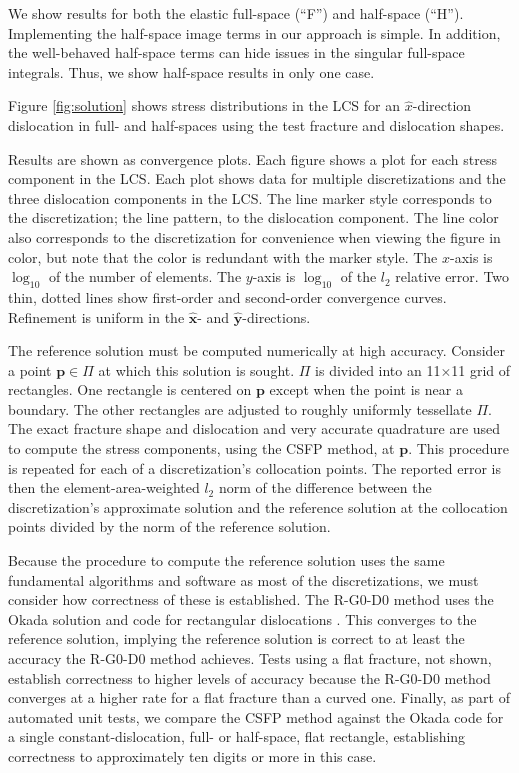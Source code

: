 \documentclass[11pt]{article}
\renewcommand{\vec}[1]{\boldsymbol{#1}}
\newcommand{\uvec}[1]{\hat{\boldsymbol{#1}}}
\begin{document}
We show results for both the elastic full-space (``F'') and half-space (``H'').
Implementing the half-space image terms in our approach is simple.
In addition, the well-behaved half-space terms can hide issues in the singular full-space integrals.
Thus, we show half-space results in only one case.

Figure \ref{fig:solution} shows stress distributions
in the LCS for an $\hat{x}$-direction dislocation in full- and half-spaces
using the test fracture and dislocation shapes.

Results are shown as convergence plots.
Each figure shows a plot for each stress component in the LCS.
Each plot shows data for multiple discretizations
and the three dislocation components in the LCS.
The line marker style corresponds to the discretization;
the line pattern, to the dislocation component.
The line color also corresponds to the discretization
for convenience when viewing the figure in color,
but note that the color is redundant with the marker style.
The $x$-axis is $\log_{10}$ of the number of elements.
The $y$-axis is $\log_{10}$ of the $l_2$ relative error.
Two thin, dotted lines show first-order and second-order convergence curves.
Refinement is uniform in the $\uvec{x}$- and $\uvec{y}$-directions.

The reference solution must be computed numerically at high accuracy.
Consider a point $\vec{p} \in \Pi$ at which this solution is sought.
$\Pi$ is divided into an 11$\times$11 grid of rectangles.
One rectangle is centered on $\vec{p}$
except when the point is near a boundary.
The other rectangles are adjusted to roughly uniformly tessellate $\Pi$.
The exact fracture shape and dislocation and very accurate quadrature
are used to compute the stress components,
using the CSFP method, at $\vec{p}$.
This procedure is repeated for each of a discretization's collocation points.
The reported error is then the element-area-weighted $l_2$ norm of
the difference between the discretization's approximate solution
and the reference solution at the collocation points
divided by the norm of the reference solution.

Because the procedure to compute the reference solution uses
the same fundamental algorithms and software as most of the discretizations,
we must consider how correctness of these is established.
The R-G0-D0 method uses the Okada solution and code for rectangular dislocations \citep{okada1992internal}.
This converges to the reference solution,
implying the reference solution is correct to at least the accuracy the R-G0-D0 method achieves.
Tests using a flat fracture, not shown, establish correctness to higher levels of accuracy
because the R-G0-D0 method converges at a higher rate for a flat fracture than a curved one.
Finally, as part of automated unit tests,
we compare the CSFP method against the Okada code
for a single constant-dislocation, full- or half-space, flat rectangle,
establishing correctness to approximately ten digits or more in this case.
\end{document}
